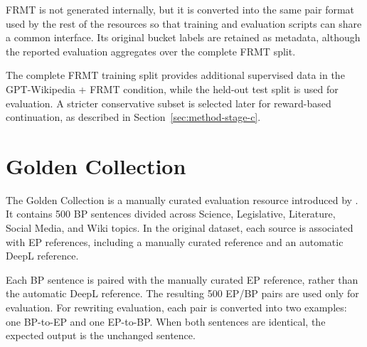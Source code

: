 FRMT is not generated internally, but it is converted into the same pair
format used by the rest of the resources so that training and evaluation
scripts can share a common interface. Its original bucket labels are retained
as metadata, although the reported evaluation aggregates over the complete
FRMT split.

{
The complete FRMT training split provides additional supervised data in the
GPT-Wikipedia + FRMT condition, while the held-out test split is used for evaluation.
A stricter conservative subset is selected later for reward-based continuation,
as described in Section~\ref{sec:method-stage-c}.\par}

\section{Golden Collection}
\label{sec:data-golden-collection}

The Golden Collection is a manually curated evaluation resource introduced by
\citet{sanches2024brazilianportugueseeuropeanportuguese}. It contains 500 BP
sentences divided across Science, Legislative, Literature, Social Media, and
Wiki topics. In the original dataset, each source is associated with EP references, including a
manually curated reference and an automatic DeepL reference.

{
Each BP sentence is paired with the manually curated EP
reference, rather than the automatic DeepL reference. The resulting 500 EP/BP
pairs are used only for evaluation. For rewriting evaluation, each pair is
converted into two examples: one BP-to-EP and one EP-to-BP. When both
sentences are identical, the expected output is the unchanged sentence.
\par}
